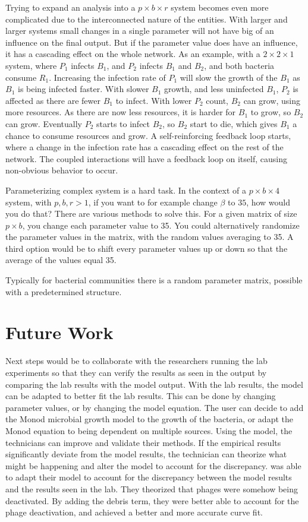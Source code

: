 Trying to expand an analysis into a $p\times b\times r$ system becomes even more complicated due to the interconnected nature of the entities. 
With larger and larger systems small changes in a single parameter will not have big of an influence on the final output. 
But if the parameter value does have an influence, it has a cascading effect on the whole network. 
As an example, with a $2\times 2\times 1$ system, where $P_1$ infects $B_1$, and $P_2$ infects $B_1$ and $B_2$, and both bacteria consume $R_1$.  
Increasing the infection rate of $P_1$ will slow the growth of the $B_1$ as $B_1$ is being infected faster. 
With slower $B_1$ growth, and less uninfected $B_1$, $P_2$ is affected as there are fewer $B_1$ to infect. With lower $P_2$ count, $B_2$ can grow, using more resources. 
As there are now less resources, it is harder for $B_1$ to grow, so $B_2$ can grow. 
Eventually $P_2$ starts to infect $B_2$, so $B_2$ start to die, which gives $B_1$ a chance to consume resources and grow. 
A self-reinforcing feedback loop starts, where a change in the infection rate has a cascading effect on the rest of the network. 
The coupled interactions will have a feedback loop on itself, causing non-obvious behavior to occur. 

Parameterizing complex system is a hard task. 
In the context of a $p\times b\times 4$ system, with $p, b, r > 1$, if you want to for example change $\beta$ to $35$, how would you do that? 
There are various methods to solve this. 
For a given matrix of size $p\times b$, you change each parameter value to 35. 
You could alternatively randomize the parameter values in the matrix, with the random values averaging to 35. 
A third option would be to shift every parameter values up or down so that the average of the values equal 35. 

Typically for bacterial communities there is a random parameter matrix, possible with a predetermined structure. 

\section{Future Work}
\label{Future Work}
Next steps would be to collaborate with the researchers running the lab experiments so that they can verify the results as seen in the output by comparing the lab results with the model output. 
With the lab results, the model can be adapted to better fit the lab results. 
This can be done by changing parameter values, or by changing the model equation. 
The user can decide to add the Monod microbial growth model to the growth of the bacteria, or adapt the Monod equation to being dependent on multiple sources. 
Using the model, the technicians can improve and validate their methods. 
If the empirical results significantly deviate from the model results, the technician can theorize what might be happening and alter the model to account for the discrepancy. 
\citet{deyEmergentHigherorderInteractions2025} was able to adapt their model to account for the discrepancy between the model results and the results seen in the lab. 
They theorized that phages were somehow being deactivated. 
By adding the debris term, they were better able to account for the phage deactivation, and achieved a better and more accurate curve fit. 

